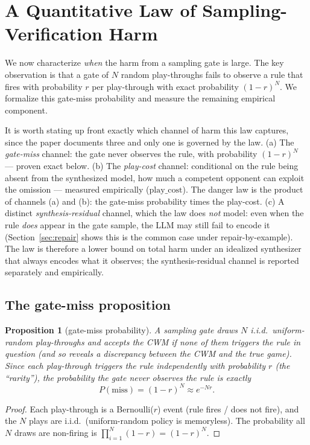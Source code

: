 \documentclass[11pt]{article}
\newtheorem{proposition}{Proposition}
\theoremstyle{remark}
\begin{document}
\section{A Quantitative Law of Sampling-Verification Harm}
\label{sec:danger-law}

We now characterize \emph{when} the harm from a sampling gate is large. The key observation is that a gate of $N$ random play-throughs fails to observe a rule that fires with probability $r$ per play-through with exact probability $(1 - r)^N$. We formalize this gate-miss probability and measure the remaining empirical component.

It is worth stating up front exactly which channel of harm this law captures, since the paper documents three and only one is governed by the law. (a) The \emph{gate-miss} channel: the gate never observes the rule, with probability $(1-r)^N$ --- proven exact below. (b) The \emph{play-cost} channel: conditional on the rule being absent from the synthesized model, how much a competent opponent can exploit the omission --- measured empirically ($\mathrm{play\_cost}$). The danger law is the product of channels (a) and (b): the gate-miss probability times the play-cost. (c) A distinct \emph{synthesis-residual} channel, which the law does \emph{not} model: even when the rule \emph{does} appear in the gate sample, the LLM may still fail to encode it (Section~\ref{sec:repair} shows this is the common case under repair-by-example). The law is therefore a lower bound on total harm under an idealized synthesizer that always encodes what it observes; the synthesis-residual channel is reported separately and empirically.

\subsection{The gate-miss proposition}

\begin{proposition}[gate-miss probability]
\label{prop:gatemiss}
A sampling gate draws $N$ i.i.d.\ uniform-random play-throughs and accepts the CWM if none of them triggers the rule in question (and so reveals a discrepancy between the CWM and the true game). Since each play-through triggers the rule independently with probability $r$ (the ``rarity''), the probability the gate never observes the rule is exactly
\[
P(\mathrm{miss}) = (1 - r)^N \approx e^{-Nr}.
\]
\end{proposition}

\begin{proof}
Each play-through is a Bernoulli($r$) event (rule fires / does not fire), and the $N$ plays are i.i.d.\ (uniform-random policy is memoryless). The probability all $N$ draws are non-firing is $\prod_{i=1}^{N}(1-r) = (1-r)^N$.
\end{proof}
\end{document}

